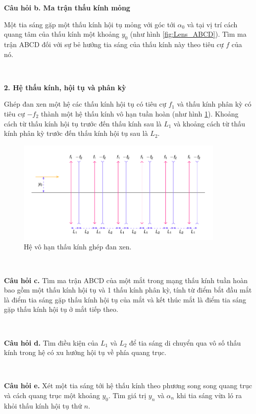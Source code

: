 \textbf{Câu hỏi b. Ma trận thấu kính mỏng}

Một tia sáng gặp một thấu kính hội tụ mỏng với góc tới \(\alpha_0\) và tại vị trí cách quang tâm của thấu kính một khoảng \(y_0\) (như hình \ref{fig:Lens_ABCD}). Tìm ma trận ABCD đối với sự bẻ hướng tia sáng của thấu kính này theo tiêu cự \(f\) của nó.

\ \ 

\textbf{2. Hệ thấu kính, hội tụ và phân kỳ}

Ghép đan xen một hệ các thấu kính hội tụ có tiêu cự \(f_1\) và thấu kính phân kỳ có tiêu cự \(-f_2\) thành một hệ thấu kính vô hạn tuần hoàn (như hình \ref{fig:Infinites_lens}). Khoảng cách từ thấu kính hội tụ trước đến thấu kính sau là \(L_1\) và khoảng cách từ thấu kính phân kỳ trước đến thấu kính hội tụ sau là \(L_2\). 
\begin{figure}[!h]
    \centering
    \includegraphics[width=0.9\textwidth]{Problem_4/Figs_P4/Infinite_lens.pdf}
    \caption{Hệ vô hạn thấu kính ghép đan xen.}
    \label{fig:Infinites_lens}
\end{figure}

\ \ 

\textbf{Câu hỏi c.} Tìm ma trận ABCD của một mắt trong mạng thấu kính tuần hoàn bao gồm một thấu kính hội tụ và 1 thấu kính phân kỳ, tính từ điểm bắt đầu mắt là điểm tia sáng gặp thấu kính hội tụ của mắt và kết thúc mắt là điểm tia sáng gặp thấu kính hội tụ ở mắt tiếp theo.

\ \ 

\textbf{Câu hỏi d.} Tìm điều kiện của \(L_1\) và \(L_2\) để tia sáng di chuyển qua vô số thấu kính trong hệ có xu hướng hội tụ về phía quang trục.

\ \ 

\textbf{Câu hỏi e.} Xét một tia sáng tới hệ thấu kính theo phương song song quang trục và cách quang trục một khoảng \(y_0\). Tìm giá trị \(y_n\) và \(\alpha_n\) khi tia sáng vừa ló ra khỏi thấu kính hội tụ thứ \(n\).